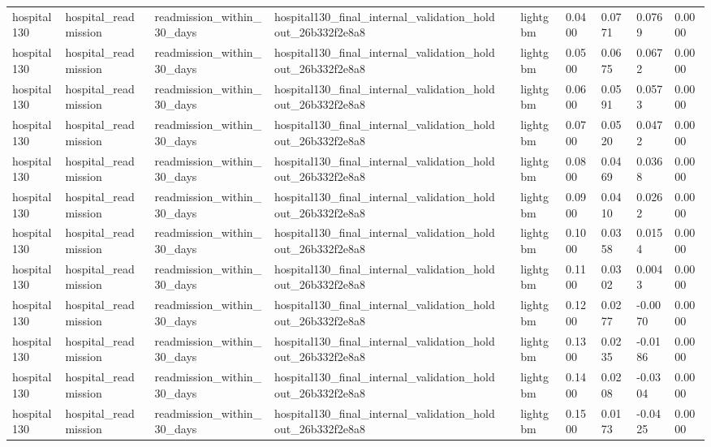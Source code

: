 \begin{tabular}{llllllllll}
hospital130 & hospital\_readmission & readmission\_within\_30\_days & hospital130\_final\_internal\_validation\_holdout\_26b332f2e8a8 &  & lightgbm & 0.0400 & 0.0771 & 0.0769 & 0.0000 \\
hospital130 & hospital\_readmission & readmission\_within\_30\_days & hospital130\_final\_internal\_validation\_holdout\_26b332f2e8a8 &  & lightgbm & 0.0500 & 0.0675 & 0.0672 & 0.0000 \\
hospital130 & hospital\_readmission & readmission\_within\_30\_days & hospital130\_final\_internal\_validation\_holdout\_26b332f2e8a8 &  & lightgbm & 0.0600 & 0.0591 & 0.0573 & 0.0000 \\
hospital130 & hospital\_readmission & readmission\_within\_30\_days & hospital130\_final\_internal\_validation\_holdout\_26b332f2e8a8 &  & lightgbm & 0.0700 & 0.0520 & 0.0472 & 0.0000 \\
hospital130 & hospital\_readmission & readmission\_within\_30\_days & hospital130\_final\_internal\_validation\_holdout\_26b332f2e8a8 &  & lightgbm & 0.0800 & 0.0469 & 0.0368 & 0.0000 \\
hospital130 & hospital\_readmission & readmission\_within\_30\_days & hospital130\_final\_internal\_validation\_holdout\_26b332f2e8a8 &  & lightgbm & 0.0900 & 0.0410 & 0.0262 & 0.0000 \\
hospital130 & hospital\_readmission & readmission\_within\_30\_days & hospital130\_final\_internal\_validation\_holdout\_26b332f2e8a8 &  & lightgbm & 0.1000 & 0.0358 & 0.0154 & 0.0000 \\
hospital130 & hospital\_readmission & readmission\_within\_30\_days & hospital130\_final\_internal\_validation\_holdout\_26b332f2e8a8 &  & lightgbm & 0.1100 & 0.0302 & 0.0043 & 0.0000 \\
hospital130 & hospital\_readmission & readmission\_within\_30\_days & hospital130\_final\_internal\_validation\_holdout\_26b332f2e8a8 &  & lightgbm & 0.1200 & 0.0277 & -0.0070 & 0.0000 \\
hospital130 & hospital\_readmission & readmission\_within\_30\_days & hospital130\_final\_internal\_validation\_holdout\_26b332f2e8a8 &  & lightgbm & 0.1300 & 0.0235 & -0.0186 & 0.0000 \\
hospital130 & hospital\_readmission & readmission\_within\_30\_days & hospital130\_final\_internal\_validation\_holdout\_26b332f2e8a8 &  & lightgbm & 0.1400 & 0.0208 & -0.0304 & 0.0000 \\
hospital130 & hospital\_readmission & readmission\_within\_30\_days & hospital130\_final\_internal\_validation\_holdout\_26b332f2e8a8 &  & lightgbm & 0.1500 & 0.0173 & -0.0425 & 0.0000 \\

\end{tabular}
